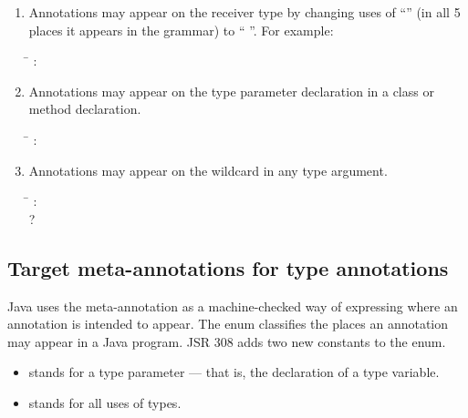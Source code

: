 \documentclass[10pt]{article}
\begin{document}
\begin{enumerate}
\item
Annotations may appear on the receiver type by changing uses of
``'' (in
all 5 places it appears in the grammar)
to `` ''.  For example:

\begin{tabbing}
\qquad \= \kill
{}: \\
\qquad            {}   \nt{(}  \altor{} \term{;} \nt{)}
\end{tabbing}

\item
Annotations may appear on the type parameter declaration in a class or method
declaration.

\begin{tabbing}
\qquad \= \kill
{}: \\
\qquad            {}  
\end{tabbing}

\item
Annotations may appear on the wildcard in any type argument.

\begin{tabbing}
\qquad \= \kill
{}: \\
\qquad            {} ? 
\end{tabbing}

\end{enumerate}



\subsection{Target meta-annotations for type annotations\label{target-meta-annotation}}

Java uses the  meta-annotation as a machine-checked way of
expressing where an annotation is intended to appear.  The
 enum classifies the places an annotation may appear in a
Java program.  JSR 308 adds two new constants to the 
enum.

\begin{itemize}
\item
{} stands for a type parameter --- that is,
the declaration of a type variable.
\item
{} stands for all uses of types.
\end{itemize}
\end{document}
